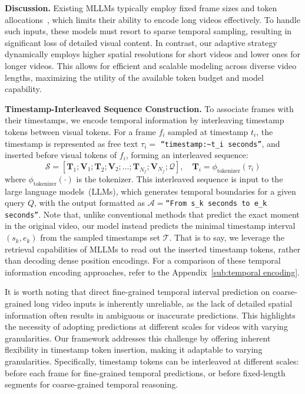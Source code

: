 \noindent \textbf{Discussion.}
Existing MLLMs typically employ fixed frame sizes and token allocations~\cite{video_chatgpt,llava_next_video,llava_onevision}, which limits their ability to encode long videos effectively. To handle such inputs, these models must resort to sparse temporal sampling, resulting in significant loss of detailed visual content.
In contrast, our adaptive strategy dynamically employs higher spatial resolutions for short videos and lower ones for longer videos. This allows for efficient and scalable modeling across diverse video lengths, maximizing the utility of the available token budget and model capability.

\noindent \textbf{Timestamp-Interleaved Sequence Construction.}
To associate frames with their timestamps, we encode temporal information by interleaving timestamp tokens between visual tokens. 
For a frame $f_i$ sampled at timestamp $t_i$, 
the timestamp is represented as free text $\tau_i=$ \texttt{``timestamp:$~t_i$ seconds''},
and inserted before visual tokens of $f_i$, forming an interleaved sequence:
\begin{equation}
\label{equ:short}
    \mathcal{S} = [\mathbf{T}_1;\mathbf{V}_1;\mathbf{T}_2;\mathbf{V}_2;\dots;\mathbf{T}_{N_f};\mathbf{V}_{N_f};\mathcal{Q}],\quad \mathbf{T}_i = \phi_{\text{tokenizer}}(\tau_i)
\end{equation}
where $\phi_{\text{tokenizer}}(\cdot)$ is the tokenizer.
This interleaved sequence is input to the large language models~(LLMs), 
which generates temporal boundaries for a given query $Q$, with the output formatted as $\mathcal{A}=$\texttt{``From $s_k$ seconds to $e_k$ seconds''}. 
Note that, unlike conventional methods that predict the exact moment in the original video, our model instead predicts the minimal timestamp interval $(s_{k}, e_{k})$ from the sampled timestamps set $\mathcal{T}$. 
That is to say, we leverage the retrieval capabilities of MLLMs to read out the inserted timestamp tokens, rather than decoding dense position encodings. For a comparison of these temporal information encoding approaches, refer to the Appendix~\ref{sub:temporal encoding}.

It is worth noting that direct fine-grained temporal interval prediction on coarse-grained long video inputs is inherently unreliable, as the lack of detailed spatial information often results in ambiguous or inaccurate predictions.
This highlights the necessity of adopting predictions at different scales for videos with varying granularities.
Our framework addresses this challenge by offering inherent flexibility in timestamp token insertion, making it adaptable to varying granularities. Specifically, timestamp tokens can be interleaved at different scales: before each frame for fine-grained temporal predictions, or before fixed-length segments for coarse-grained temporal reasoning.

